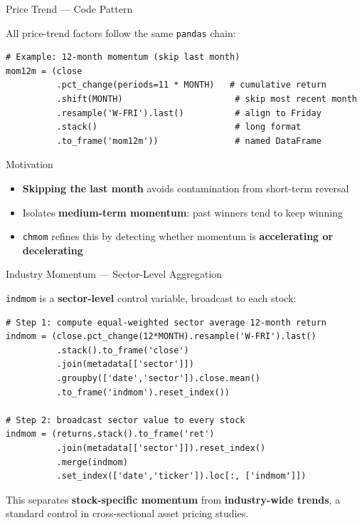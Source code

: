 \documentclass[aspectratio=169]{beamer}
\begin{document}
\begin{frame}[fragile]{Price Trend --- Code Pattern}

All price-trend factors follow the same \texttt{pandas} chain:

\begin{lstlisting}
# Example: 12-month momentum (skip last month)
mom12m = (close
          .pct_change(periods=11 * MONTH)   # cumulative return
          .shift(MONTH)                      # skip most recent month
          .resample('W-FRI').last()          # align to Friday
          .stack()                           # long format
          .to_frame('mom12m'))               # named DataFrame
\end{lstlisting}

\vspace{0.2cm}

\begin{block}{Motivation}
\begin{itemize}
  \item \textbf{Skipping the last month} avoids contamination from short-term reversal
  \item Isolates \textbf{medium-term momentum}: past winners tend to keep winning
  \item \texttt{chmom} refines this by detecting whether momentum is \textbf{accelerating or decelerating}
\end{itemize}
\end{block}

\end{frame}
%
%
\begin{frame}[fragile]{Industry Momentum --- Sector-Level Aggregation}

\texttt{indmom} is a \textbf{sector-level} control variable, broadcast to each stock:

\begin{lstlisting}
# Step 1: compute equal-weighted sector average 12-month return
indmom = (close.pct_change(12*MONTH).resample('W-FRI').last()
          .stack().to_frame('close')
          .join(metadata[['sector']])
          .groupby(['date','sector']).close.mean()
          .to_frame('indmom').reset_index())

# Step 2: broadcast sector value to every stock
indmom = (returns.stack().to_frame('ret')
          .join(metadata[['sector']]).reset_index()
          .merge(indmom)
          .set_index(['date','ticker']).loc[:, ['indmom']])
\end{lstlisting}

\vspace{0.2cm}

This separates \textbf{stock-specific momentum} from \textbf{industry-wide trends},
a standard control in cross-sectional asset pricing studies.

\end{frame}
\end{document}

